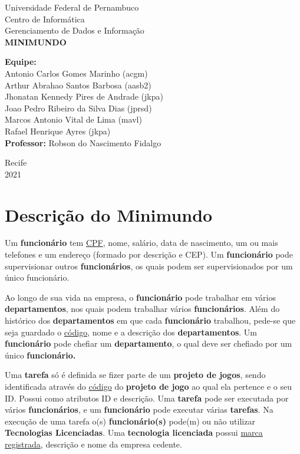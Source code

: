 \documentclass[12pt, a4paper]{article}
\begin{document}
\begin{titlepage}
\begin{center}
{\large Universidade Federal de Pernambuco}\\[0.2cm]
{\large Centro de Informática}\\[0.2cm]
{\large Gerenciamento de Dados e Informação}\\[3.7cm]
{\bf \huge MINIMUNDO}\\[5.cm]
\end{center}
{\large {\bf Equipe:}\\[0.2cm]
Antonio Carlos Gomes Marinho (acgm)\\[0.2cm]
Arthur Abrahao Santos Barbosa (aasb2)\\[0.2cm]
Jhonatan Kennedy Pires de Andrade (jkpa)\\[0.2cm]
Joao Pedro Ribeiro da Silva Dias (jprsd)\\[0.2cm]
Marcos Antonio Vital de Lima (mavl)\\[0.2cm]
Rafael Henrique Ayres (jkpa)\\[0.2cm]}
{\large {\bf Professor:} Robson do Nascimento Fidalgo}\\[2cm]
\begin{center}
{\large Recife}\\[0.2cm]
{\large 2021}\\[0.2cm]
\end{center}
\end{titlepage}
\onehalfspacing
\section{Descrição do Minimundo}

Um \textbf{funcionário} tem \underline{CPF}, nome, salário, data de nascimento, um ou mais telefones e um endereço (formado por descrição e CEP). Um \textbf{funcionário} pode supervisionar outros \textbf{funcionários}, os quais podem ser supervisionados por um único funcionário.

Ao longo de sua vida na empresa, o \textbf{funcionário} pode trabalhar em vários \textbf{departamentos}, 
nos quais podem trabalhar vários \textbf{funcionários}. Além do histórico dos \textbf{departamentos} em que cada 
\textbf{funcionário} trabalhou, pede-se que seja guardado o \underline{código}, nome e a descrição dos \textbf{departamentos}. 
Um \textbf{funcionário} pode chefiar um \textbf{departamento}, o qual deve ser chefiado por um único \textbf{funcionário.}

Uma \textbf{tarefa} só é definida se fizer parte de um \textbf{projeto de jogos}, sendo identificada através do 
\underline{código} do \textbf{projeto de jogo} ao qual ela pertence e o seu ID. Possui como atributos ID e descrição. 
Uma \textbf{tarefa} pode ser executada por vários \textbf{funcionários}, e um \textbf{funcionário} pode executar várias \textbf{tarefas}.
 Na execução de uma tarefa o(s) \textbf{funcionário(s)} pode(m) ou não utilizar \textbf{Tecnologias Licenciadas}. 
 Uma \textbf{tecnologia licenciada} possui \underline{marca registrada}, descrição e nome da empresa cedente. 
\end{document}
